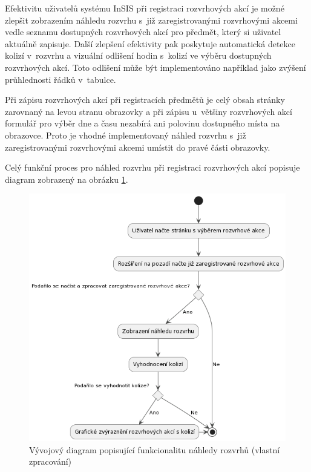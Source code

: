 Efektivitu uživatelů systému InSIS při registraci rozvrhových akcí je možné zlepšit zobrazením náhledu rozvrhu s~již zaregistrovanými rozvrhovými akcemi vedle seznamu dostupných rozvrhových akcí pro předmět, který si uživatel aktuálně zapisuje. Další zlepšení efektivity pak poskytuje automatická detekce kolizí v~rozvrhu a vizuální odlišení hodin s~kolizí ve výběru dostupných rozvrhových akcí. Toto odlišení může být implementováno například jako zvýšení průhlednosti řádků v~tabulce. 

Při zápisu rozvrhových akcí při registracích předmětů je celý obsah stránky zarovnaný na levou stranu obrazovky a při zápisu u~většiny rozvrhových akcí formulář pro výběr dne a času nezabírá ani polovinu dostupného místa na obrazovce. Proto je vhodné implementovaný náhled rozvrhu s~již zaregistrovanými rozvrhovými akcemi umístit do pravé části obrazovky.

Celý funkční proces pro náhled rozvrhu při registraci rozvrhových akcí popisuje diagram zobrazený na obrázku \ref{fig:wireframe-timetable-preview}.

\begin{figure}[htbp!]\centering
    \includegraphics[width=\textwidth]{img/flow-timetable-preview.png}
    \caption{Vývojový diagram popisující funkcionalitu náhledy rozvrhů (vlastní zpracování)}
    \label{fig:wireframe-timetable-preview}
\end{figure}

